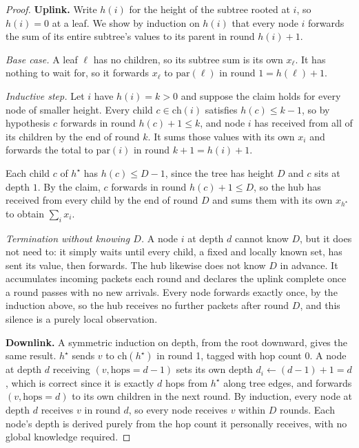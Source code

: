 \documentclass[letterpaper]{article} %
\begin{document}
\begin{proof}
\textbf{Uplink.} Write $h(i)$ for the height of the subtree rooted at $i$,
so $h(i)=0$ at a leaf. We show by induction on $h(i)$ that every node $i$
forwards the sum of its entire subtree's values to its parent in round
$h(i)+1$.

\emph{Base case.} A leaf $\ell$ has no children, so its subtree sum is its
own $x_\ell$. It has nothing to wait for, so it forwards $x_\ell$ to
$\mathrm{par}(\ell)$ in round $1 = h(\ell)+1$.

\emph{Inductive step.} Let $i$ have $h(i)=k>0$ and suppose the claim holds
for every node of smaller height. Every child $c\in\mathrm{ch}(i)$ satisfies
$h(c)\leq k-1$, so by hypothesis $c$ forwards in round $h(c)+1\leq k$, and
node $i$ has received from all of its children by the end of round $k$. It
sums those values with its own $x_i$ and forwards the total to
$\mathrm{par}(i)$ in round $k+1 = h(i)+1$.

Each child $c$ of $h^\star$ has $h(c)\leq D-1$, since the tree has height
$D$ and $c$ sits at depth $1$. By the claim, $c$ forwards in round
$h(c)+1\leq D$, so the hub has received from every child by the end of round
$D$ and sums them with its own $x_{h^\star}$ to obtain $\sum_i x_i$.

\emph{Termination without knowing $D$.} A node $i$ at depth $d$ cannot know
$D$, but it does not need to: it simply waits until every child, a fixed
and locally known set, has sent its value, then forwards. The hub likewise
does not know $D$ in advance. It accumulates incoming packets each round
and declares the uplink complete once a round passes with no new arrivals.
Every node forwards exactly once, by the induction above, so the hub
receives no further packets after round $D$, and this silence is a purely
local observation.

\textbf{Downlink.} A symmetric induction on depth, from the root downward,
gives the same result. $h^\star$ sends $v$ to $\mathrm{ch}(h^\star)$ in
round 1, tagged with hop count $0$. A node at depth $d$ receiving $(v,
\mathrm{hops}=d-1)$ sets its own depth $d_i \leftarrow (d-1)+1 = d$, which
is correct since it is exactly $d$ hops from $h^\star$ along tree edges,
and forwards $(v, \mathrm{hops}=d)$ to its own children in the next round.
By induction, every node at depth $d$ receives $v$ in round $d$, so every
node receives $v$ within $D$ rounds. Each node's depth is derived purely
from the hop count it personally receives, with no global knowledge
required.
\end{proof}
\end{document}

